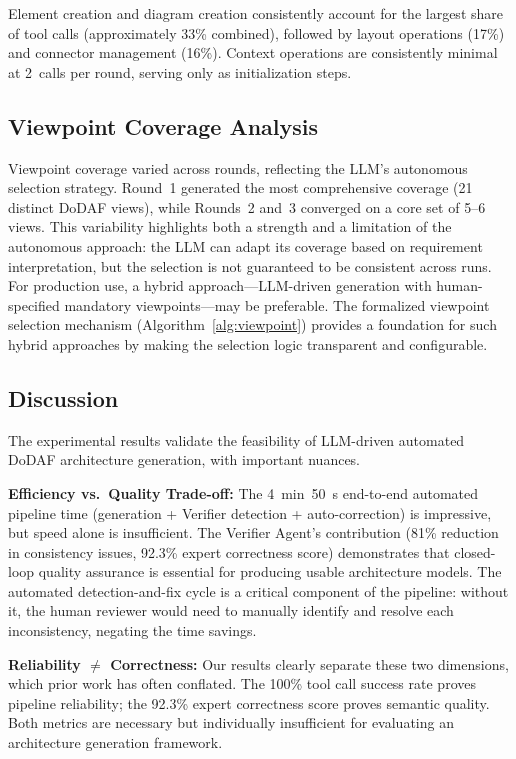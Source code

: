 \documentclass{ieeeaccess}
\begin{document}
Element creation and diagram creation consistently account for the largest share of tool calls (approximately 33\% combined), followed by layout operations (17\%) and connector management (16\%). Context operations are consistently minimal at 2~calls per round, serving only as initialization steps.

\subsection{Viewpoint Coverage Analysis}

Viewpoint coverage varied across rounds, reflecting the LLM's autonomous selection strategy. Round~1 generated the most comprehensive coverage (21 distinct DoDAF views), while Rounds~2 and~3 converged on a core set of 5--6 views. This variability highlights both a strength and a limitation of the autonomous approach: the LLM can adapt its coverage based on requirement interpretation, but the selection is not guaranteed to be consistent across runs. For production use, a hybrid approach---LLM-driven generation with human-specified mandatory viewpoints---may be preferable. The formalized viewpoint selection mechanism (Algorithm~\ref{alg:viewpoint}) provides a foundation for such hybrid approaches by making the selection logic transparent and configurable.

\subsection{Discussion}

The experimental results validate the feasibility of LLM-driven automated DoDAF architecture generation, with important nuances.

\textbf{Efficiency vs.\ Quality Trade-off:} The 4~min~50~s end-to-end automated pipeline time (generation + Verifier detection + auto-correction) is impressive, but speed alone is insufficient. The Verifier Agent's contribution (81\% reduction in consistency issues, 92.3\% expert correctness score) demonstrates that closed-loop quality assurance is essential for producing usable architecture models. The automated detection-and-fix cycle is a critical component of the pipeline: without it, the human reviewer would need to manually identify and resolve each inconsistency, negating the time savings.

\textbf{Reliability $\neq$ Correctness:} Our results clearly separate these two dimensions, which prior work has often conflated. The 100\% tool call success rate proves pipeline reliability; the 92.3\% expert correctness score proves semantic quality. Both metrics are necessary but individually insufficient for evaluating an architecture generation framework.
\end{document}
